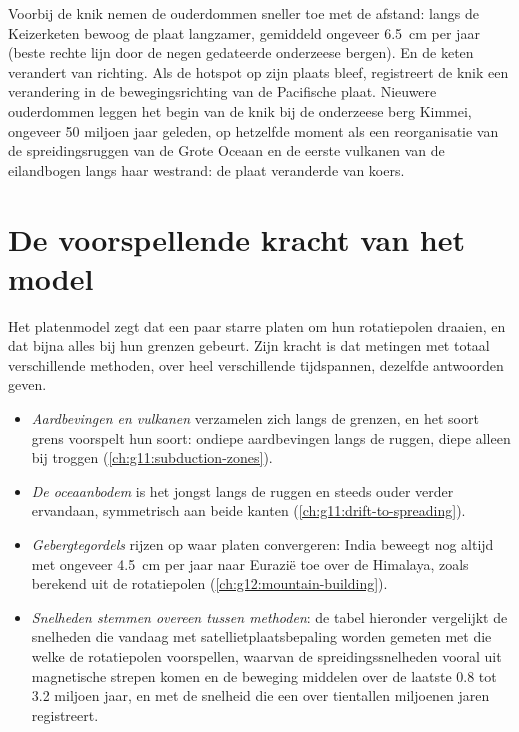 Voorbij de knik nemen de ouderdommen sneller toe met de afstand: langs de
Keizerketen bewoog de plaat langzamer, gemiddeld ongeveer \qty{6.5}{cm} per jaar
(beste rechte lijn door de negen gedateerde onderzeese bergen). En de keten
verandert van richting. Als de hotspot op zijn plaats bleef, registreert de knik
een verandering in de bewegingsrichting van de Pacifische plaat. Nieuwere
ouderdommen leggen het begin van de knik bij de onderzeese berg Kimmei, ongeveer 50
miljoen jaar geleden, op hetzelfde moment als een reorganisatie van de
spreidingsruggen van de Grote Oceaan en de eerste vulkanen van de eilandbogen langs
haar westrand: de plaat veranderde van koers.

\section{De voorspellende kracht van het model}\label{sec:g11:plate-motions:predictive}

Het platenmodel zegt dat een paar starre platen om hun rotatiepolen draaien, en
dat bijna alles bij hun grenzen gebeurt. Zijn kracht is dat metingen met totaal
verschillende methoden, over heel verschillende tijdspannen, dezelfde
antwoorden geven.

\begin{itemize}
  \item \emph{Aardbevingen en vulkanen} verzamelen zich langs de grenzen, en het
        soort grens voorspelt hun soort: ondiepe aardbevingen langs de
        ruggen, diepe alleen bij troggen (\cref{ch:g11:subduction-zones}).
  \item \emph{De oceaanbodem} is het jongst langs de ruggen en steeds ouder
        verder ervandaan, symmetrisch aan beide kanten
        (\cref{ch:g11:drift-to-spreading}).
  \item \emph{Gebergtegordels} rijzen op waar platen convergeren: India beweegt
        nog altijd met ongeveer \qty{4.5}{cm} per jaar naar Eurazië toe over de
        Himalaya, zoals berekend uit de rotatiepolen (\cref{ch:g12:mountain-building}).
  \item \emph{Snelheden stemmen overeen tussen methoden}: de tabel hieronder
        vergelijkt de snelheden die vandaag met satellietplaatsbepaling worden
        gemeten met die welke de rotatiepolen voorspellen, waarvan de
        spreidingssnelheden vooral uit magnetische strepen komen en de beweging
        middelen over de laatste \num{0.8} tot \num{3.2} miljoen jaar, en met de
        snelheid die een  over tientallen miljoenen jaren registreert.
\end{itemize}

